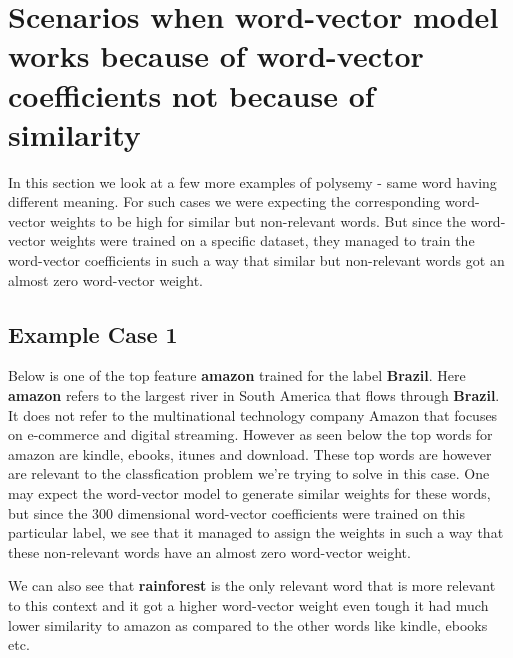 \newpage
\section{Scenarios when word-vector model works because of word-vector coefficients not because of similarity}

In this section we look at a few more examples of polysemy - same word having different meaning. For such cases we were expecting the corresponding word-vector weights to be high for similar but non-relevant words. But since the word-vector weights were trained on a specific dataset, they managed to train the word-vector coefficients in such a way that similar but non-relevant words got an almost zero word-vector weight.

\subsection{Example Case 1}

Below is one of the top feature \textbf{amazon} trained for the label \textbf{Brazil}. Here \textbf{amazon}  refers to the largest river in South America that flows through \textbf{Brazil}. It does not refer to the multinational technology company Amazon that focuses on e-commerce and digital streaming. However as seen below the top words for amazon are kindle, ebooks, itunes and download. These top words are however are relevant to the classfication problem we're trying to solve in this case. One may expect the word-vector model to generate similar weights for these words, but since the 300 dimensional word-vector coefficients were trained on this particular label, we see that it managed to assign the weights in such a way that these non-relevant words have an almost zero word-vector weight.

We can also see that \textbf{rainforest} is the only relevant word that is more relevant to this context and it got a higher word-vector weight even tough it had much lower similarity to amazon as compared to the other words like kindle, ebooks etc.

